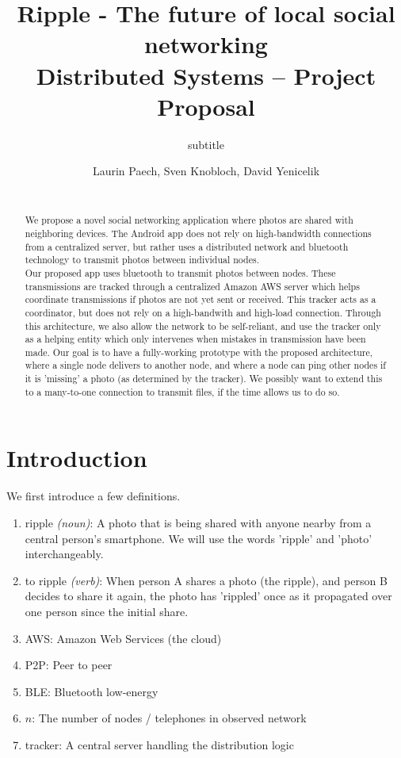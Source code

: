 \documentclass{report}
\title{Ripple - The future of local social networking\\
\normalsize{Distributed Systems -- Project Proposal}}
\subtitle{subtitle}
\author{
%
%
\alignauthor \normalsize{Laurin Paech,  Sven Knobloch, David Yenicelik}\\
	\affaddr{\normalsize{ETH ID-2 XX-XXX-XXX, lpaech 15-944-242, yedavid 15-944-366}}\\
	\email{\normalsize{one@student.ethz.ch, two@student.ethz.ch, three@student.ethz.ch}}
}
\begin{document}
\maketitle

\begin{abstract}
We propose a novel social networking application where photos are shared with neighboring devices. The Android app does not rely on high-bandwidth connections from a centralized server, but rather uses a distributed network and bluetooth technology to transmit photos between individual nodes. \\
Our proposed app uses bluetooth to transmit photos between nodes. These transmissions are tracked through a centralized Amazon AWS server which helps coordinate transmissions if photos are not yet sent or received. This tracker acts as a coordinator, but does not rely on a high-bandwith and high-load connection. Through this architecture, we also allow the network to be self-reliant, and use the tracker only as a helping entity which only intervenes when mistakes in transmission have been made. Our goal is to have a fully-working prototype with the proposed architecture, where a single node delivers to another node, and where a node can ping other nodes if it is 'missing' a photo (as determined by the tracker). We possibly want to extend this to a many-to-one connection to transmit files, if the time allows us to do so.
\end{abstract}

\section{Introduction}

We first introduce a few definitions.

\begin{enumerate}
\item ripple \textit{(noun)}: A photo that is being shared with anyone nearby from a central person's smartphone. We will use the words 'ripple' and 'photo' interchangeably. 
\item to ripple \textit{(verb)}: When person A shares a photo (the ripple), and person B decides to share it again, the photo has 'rippled' once as it propagated over one person since the initial share.
\item AWS: Amazon Web Services (the cloud)
\item P2P: Peer to peer
\item BLE: Bluetooth low-energy
\item $ n $: The number of nodes / telephones in observed network
\item tracker: A central server handling the distribution logic
\end{enumerate}
\end{document}
